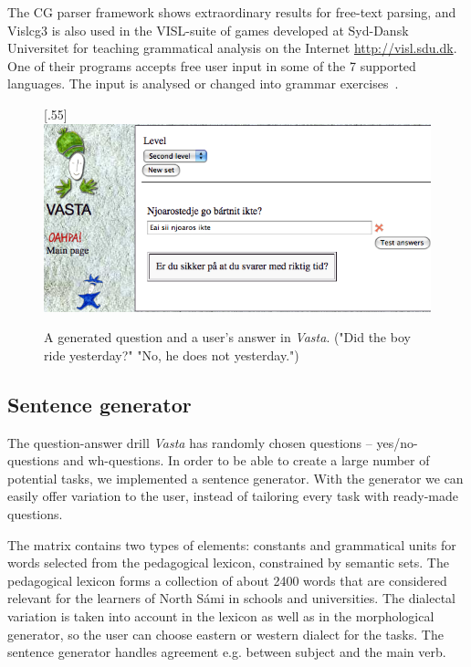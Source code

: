\documentclass[11pt]{article}
\begin{document}
The CG parser framework shows extraordinary results for free-text parsing, and Vislcg3 is also used in the VISL-suite of games developed at Syd-Dansk Universitet for teaching grammatical analysis on the Internet \url{http://visl.sdu.dk}. One of their  programs accepts free user input in some of the 7 supported languages. The input is analysed or changed into grammar exercises~\cite{Bick:05}.


\begin{figure}[htbp]
\begin{center}
\scalebox{.55}[.55]{\includegraphics{presentation/img/newvasta.png}}\\
\caption{A generated question and a user's answer in \textit{Vasta}. ("Did the boy ride yesterday?" "No, he does not yesterday.")}
\label{vastasent}
\end{center}
\end{figure}


\subsection{Sentence generator}
The question-answer drill \textit{Vasta} has randomly chosen questions -- yes/no-questions and wh-questions. In order to be able to create a large number of potential tasks, we implemented a sentence generator. With the generator we can easily offer variation to the user, instead of tailoring every task with ready-made questions.

The matrix contains two types of elements: constants and grammatical units for words selected from the pedagogical lexicon, constrained by semantic sets. The pedagogical lexicon forms a collection of about 2400 words that are considered relevant for the learners of North Sámi in schools and universities. The dialectal variation is taken into account in the lexicon as well as in the morphological generator, so the user can choose eastern or western dialect for the tasks. The sentence generator handles agreement e.g. between subject and the main verb. \\ 
\end{document}
